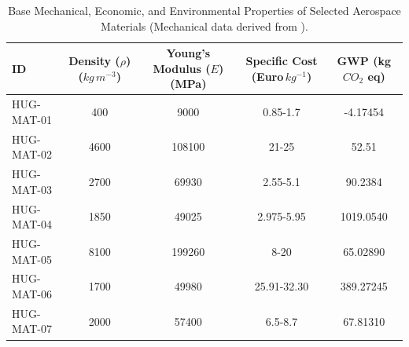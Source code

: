\begin{table}[H]
\centering
\caption{Base Mechanical, Economic, and Environmental Properties of Selected Aerospace Materials (Mechanical data derived from \cite{Mouritz2012}).}
\label{tab:base-material-properties}
\renewcommand{\arraystretch}{1.2}
\begin{tabular}{|l|c|c|c|c|}
\hline
\textbf{ID}
  & \makecell{\textbf{Density} ($\rho$)\\($kg\,m^{-3}$)}
  & \makecell{\textbf{Young's}\\\textbf{Modulus} ($E$)\\(MPa)}
  & \makecell{\textbf{Specific}\\\textbf{Cost}\\(Euro\,$kg^{-1}$)} 
  & \makecell{\textbf{GWP}\\(kg $CO_2$ eq)} \\
  
\hline\hline

HUG-MAT-01 & 400  & 9000   & 0.85-1.7 & -4.17454
\\ \hline

HUG-MAT-02 & 4600 & 108100 & 21-25 & 52.51
\\ \hline

HUG-MAT-03 & 2700 & 69930  & 2.55-5.1 & 90.2384
\\ \hline

HUG-MAT-04 & 1850 & 49025  & 2.975-5.95 & 1019.0540
\\ \hline

HUG-MAT-05 & 8100 & 199260 & 8-20 & 65.02890
\\ \hline

HUG-MAT-06 & 1700 & 49980  & 25.91-32.30 & 389.27245
\\ \hline

HUG-MAT-07 & 2000 & 57400  & 6.5-8.7 & 67.81310
\\ \hline
\end{tabular}
\end{table}



